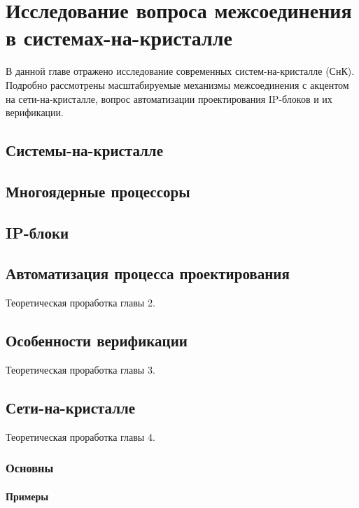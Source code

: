 
\chapter{Исследование вопроса межсоединения в системах-на-кристалле} \label{review}   %

В данной главе отражено исследование современных систем-на-кристалле (СнК). Подробно рассмотрены масштабируемые механизмы межсоединения с акцентом на сети-на-кристалле, вопрос автоматизации проектирования IP-блоков и их верификации.

\section{Системы-на-кристалле}

\section{Многоядерные процессоры}

\section{IP-блоки}

\section{Автоматизация процесса проектирования}

Теоретическая проработка главы 2.

\section{Особенности верификации}

Теоретическая проработка главы 3.

\section{Сети-на-кристалле}

Теоретическая проработка главы 4.

\subsection{Основны}

\subsubsection{Примеры}


